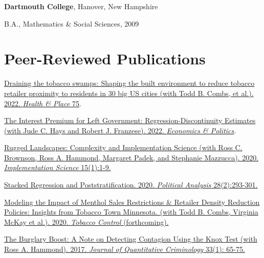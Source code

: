 \documentclass[margin,line]{res}
\newenvironment{list1}{
  \begin{list}{}{%
      \setlength{\itemsep}{0.1in}
      \setlength{\parsep}{0in} \setlength{\parskip}{0in}
      \setlength{\topsep}{0.1in} \setlength{\partopsep}{0in} 
      \setlength{\leftmargin}{0.17in}}}{\end{list}}
\newenvironment{publist}{
	\begin{list}{}{%
			\setlength{\itemsep}{0.15in}
			\setlength{\parsep}{0in} \setlength{\parskip}{0in}
			\setlength{\topsep}{0in} \setlength{\partopsep}{0in} 
			\setlength{\leftmargin}{0.15in}
			\setlength{\itemindent}{-0.15in}}}
		{\end{list}}
\begin{document}
\begin{resume}
{\bf Dartmouth College}, Hanover, New Hampshire
\begin{list1}
\item[] B.A., Mathematics \& Social Sciences, 2009
\end{list1}




\section{\sc Peer-Reviewed Publications}

\begin{publist}
	
	\item \href{https://www.sciencedirect.com/science/article/pii/S1353829222000764}{Draining the tobacco swamps: Shaping the built environment to reduce tobacco retailer proximity to residents in 30 big US cities (with Todd B. Combs, et al.). 2022. \textit{Health \& Place} 75}.
	
	\item \href{https://onlinelibrary.wiley.com/doi/abs/10.1111/ecpo.12204}{The Interest Premium for Left Government: Regression-Discontinuity Estimates (with Jude C. Hays and Robert J. Franzese). 2022. \textit{Economics \& Politics}}.
			
	\item \href{https://link.springer.com/article/10.1186/s13012-020-01028-5}{Rugged Landscapes: Complexity and Implementation Science (with Ross C. Brownson, Ross A. Hammond, Margaret Padek, and Stephanie Mazzucca). 2020. \textit{Implementation Science} 15(1):1-9.}
	
	\item \href{https://doi.org/10.1017/pan.2019.43}{Stacked Regression and Poststratification. 2020. \textit{Political Analysis} 28(2):293-301.}
	
	\item \href{http://dx.doi.org/10.1136/tobaccocontrol-2019-054986}{Modeling the Impact of Menthol Sales Restrictions \& Retailer Density Reduction Policies: Insights from Tobacco Town Minnesota. (with Todd B. Combs, Virginia McKay et al.). 2020. \textit{Tobacco Control} (forthcoming).}
	
	\item \href{https://joeornstein.github.io/publications/Ornstein-Hammond2017.pdf}{The Burglary Boost: A Note on Detecting Contagion Using the Knox Test (with Ross A. Hammond). 2017. \textit{Journal of Quantitative Criminology} 33(1): 65-75.}
	

\end{publist}
\end{resume}
\end{document}
